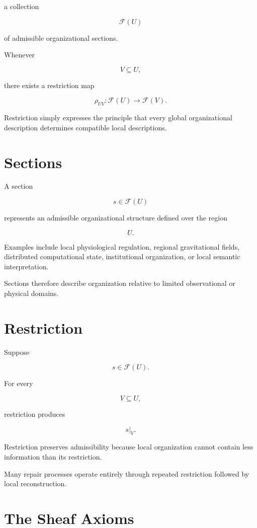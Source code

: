 \documentclass[11pt,oneside]{book}
\numberwithin{equation}{chapter}
\theoremstyle{definition}
\theoremstyle{plain}
\begin{document}
a collection

\[
\mathcal F(U)
\]

of admissible organizational sections.

Whenever

\[
V
\subseteq
U,
\]

there exists a restriction map

\[
\rho_{UV}
:
\mathcal F(U)
\rightarrow
\mathcal F(V).
\]

Restriction simply expresses the principle that every global
organizational description determines compatible local descriptions.

\section{Sections}

A section

\[
s
\in
\mathcal F(U)
\]

represents an admissible organizational structure defined over the region

\[
U.
\]

Examples include local physiological regulation, regional gravitational
fields, distributed computational state, institutional organization, or
local semantic interpretation.

Sections therefore describe organization relative to limited
observational or physical domains.

\section{Restriction}

Suppose

\[
s
\in
\mathcal F(U).
\]

For every

\[
V
\subseteq
U,
\]

restriction produces

\[
s|_V.
\]

Restriction preserves admissibility because local organization cannot
contain less information than its restriction.

Many repair processes operate entirely through repeated restriction
followed by local reconstruction.

\section{The Sheaf Axioms}
\end{document}
